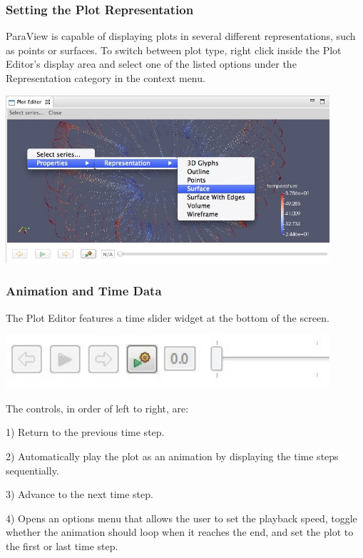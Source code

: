 \subsubsection{Setting the Plot Representation} 

ParaView is capable of displaying plots in several different representations,
such as points or surfaces. To switch between plot type, right click inside the Plot
Editor's display area and select one of the listed options under the
Representation category in the context menu.

\begin{center}
\includegraphics[width=12cm]{images/ParaViewRepresentationDropDown}
\end{center}

\subsubsection{Animation and Time Data}

The Plot Editor features a time slider widget at the bottom of the screen. 

\begin{center}
\includegraphics[width=12cm]{images/TimeSliderWidget}
\end{center}

The controls, in order of left to right, are:

1) Return to the previous time step.

2) Automatically play the plot as an animation by displaying the time steps
sequentially. 

3) Advance to the next time step. 

4) Opens an options menu that allows the user to set the playback speed, toggle
whether the animation should loop when it reaches the end, and set the plot to
the first or last time step.

